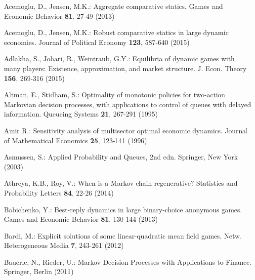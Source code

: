 %
%
% 
% 
%


\begin{thebibliography}{99.}%
%
%

Acemoglu, D., Jensen, M.K.: Aggregate comparative statics. Games and Economic Behavior \textbf{81}, 27-49 (2013)


 Acemoglu, D., Jensen, M.K.: Robust comparative statics in large
dynamic economies. Journal of Political Economy \textbf{123}, 587-640 (2015)

Adlakha, S., Johari, R., Weintraub, G.Y.: Equilibria of dynamic
games with many players: Existence, approximation, and market
structure. J. Econ. Theory \textbf{156}, 269-316 (2015)



Altman, E., Stidham, S.: Optimality of monotonic policies for two-action Markovian decision processes, with applications to control of queues with delayed information. Queueing Systems \textbf{21}, 267-291 (1995)


Amir R.: Sensitivity analysis of multisector optimal
economic dynamics. Journal of Mathematical Economics \textbf{25}, 123-141 (1996)


Asmussen, S.: Applied Probability and Queues, 2nd edn.
Springer, New York (2003)


Athreya, K.B., Roy, V.: When is a Markov chain regenerative? Statistics and Probability Letters \textbf{84}, 22-26 (2014)




 Babichenko, Y.: Best-reply dynamics in large binary-choice anonymous games. Games and Economic Behavior \textbf{81}, 130-144 (2013)

 Bardi, M.: Explicit solutions of some linear-quadratic mean field games. Netw. Heterogeneous
Media \textbf{7}, 243-261 (2012)

Bauerle, N., Rieder, U.: Markov Decision Processes with Applications to Finance.
Springer, Berlin (2011)


\end{thebibliography}
